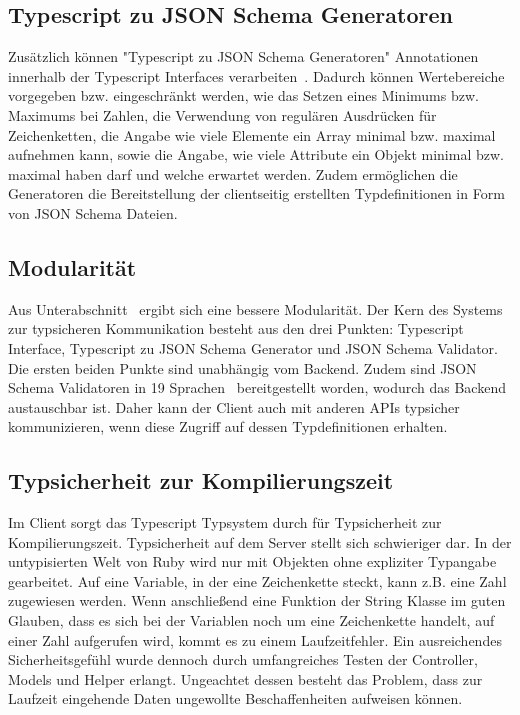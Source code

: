 \subsection{Typescript zu JSON Schema Generatoren}
\label{sec:requirements:pros:generation}
Zusätzlich können "Typescript zu JSON Schema Generatoren" Annotationen innerhalb der Typescript Interfaces verarbeiten~\cite{json-schema-generator-annotations}.
Dadurch können Wertebereiche vorgegeben bzw. eingeschränkt werden,
wie das Setzen eines Minimums bzw. Maximums bei Zahlen, die Verwendung von regulären Ausdrücken für Zeichenketten,
die Angabe wie viele Elemente ein Array minimal bzw. maximal aufnehmen kann,
sowie die Angabe, wie viele Attribute ein Objekt minimal bzw. maximal haben darf und welche erwartet werden.
Zudem ermöglichen die Generatoren die Bereitstellung der clientseitig erstellten Typdefinitionen in Form von JSON Schema Dateien.

\subsection{Modularität}
\label{sec:requirements:pros:modul}
Aus Unterabschnitt~ ergibt sich eine bessere Modularität.
Der Kern des Systems zur typsicheren Kommunikation besteht aus den drei Punkten: Typescript Interface, Typescript zu JSON Schema Generator und
JSON Schema Validator. Die ersten beiden Punkte sind unabhängig vom Backend.
Zudem sind JSON Schema Validatoren in 19 Sprachen~\cite{json-schema-implementations} bereitgestellt worden, wodurch das Backend austauschbar ist.
Daher kann der Client auch mit anderen APIs typsicher kommunizieren, wenn diese Zugriff auf dessen Typdefinitionen erhalten.

\subsection{Typsicherheit zur Kompilierungszeit}
\label{sec:requirements:pros:typesafe-compile}
Im Client sorgt das Typescript Typsystem durch für Typsicherheit zur Kompilierungszeit.
Typsicherheit auf dem Server stellt sich schwieriger dar. In der untypisierten Welt von Ruby wird nur mit Objekten ohne expliziter Typangabe gearbeitet.
Auf eine Variable, in der eine Zeichenkette steckt, kann z.B. eine Zahl zugewiesen werden. Wenn anschließend eine Funktion der String Klasse
im guten Glauben, dass es sich bei der Variablen noch um eine Zeichenkette handelt, auf einer Zahl aufgerufen wird, kommt es zu einem Laufzeitfehler.
Ein ausreichendes Sicherheitsgefühl wurde dennoch durch umfangreiches Testen der Controller, Models und Helper erlangt.
Ungeachtet dessen besteht das Problem, dass zur Laufzeit eingehende Daten ungewollte Beschaffenheiten aufweisen können.

